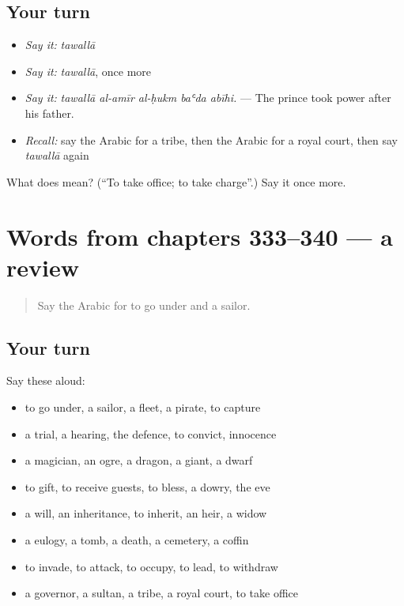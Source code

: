 \subsection*{Your turn}
\begin{itemize}
\raggedright
  \item \emph{Say it:} \emph{tawallā}
  \item \emph{Say it:} \emph{tawallā}, once more
  \item \emph{Say it:} \emph{tawallā al-amīr al-ḥukm baʿda abīhi.} — The prince took power after his father.
  \item \emph{Recall:} say the Arabic for a tribe, then the Arabic for a royal court, then say \emph{tawallā} again
\end{itemize}

\begin{tcolorbox}[breakable,colback=teal!4,colframe=teal!35!black,title={Before you move on}]
What does  mean? (\textquotedblleft{}To take office; to take charge\textquotedblright{}.) Say it once more.
\end{tcolorbox}
\section[(dialogue)]{Words from chapters 333–340 — a review}

\label{lesson:AR-R340-review-333-340}



\begin{quote}
Say the Arabic for to go under and a sailor.
\end{quote}

\subsection*{Your turn}
Say these aloud:

\begin{itemize}
\raggedright
  \item to go under, a sailor, a fleet, a pirate, to capture
  \item a trial, a hearing, the defence, to convict, innocence
  \item a magician, an ogre, a dragon, a giant, a dwarf
  \item to gift, to receive guests, to bless, a dowry, the eve
  \item a will, an inheritance, to inherit, an heir, a widow
  \item a eulogy, a tomb, a death, a cemetery, a coffin
  \item to invade, to attack, to occupy, to lead, to withdraw
  \item a governor, a sultan, a tribe, a royal court, to take office
\end{itemize}

